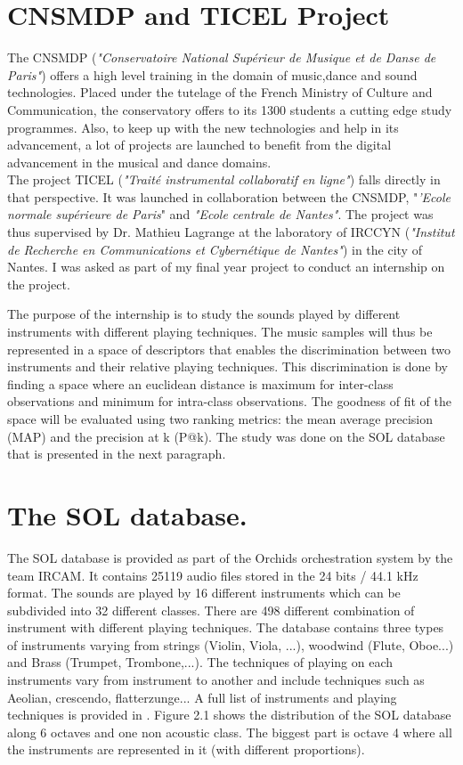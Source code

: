 \documentclass[hidelinks,12pt]{report}
\begin{document}
\section{CNSMDP and TICEL Project}
The CNSMDP  (\textit{"Conservatoire National Supérieur de Musique et de Danse de Paris"}) offers a high level training in the domain of music,dance and sound technologies. Placed under the tutelage of the French Ministry of Culture and Communication, the conservatory offers to its 1300 students a cutting edge study programmes. Also, to keep up with the new technologies and help in its advancement, a lot of projects are launched to benefit from the digital advancement in the musical and dance domains. \\
The project TICEL (\textit{"Traité instrumental collaboratif en ligne"}) falls directly in that perspective. It was launched in collaboration between the CNSMDP, "\textit{'Ecole normale supérieure de Paris}" and \textit{"Ecole centrale de Nantes"}. The project was thus supervised by Dr. Mathieu Lagrange at the laboratory of IRCCYN (\textit{"Institut de Recherche en Communications et Cybernétique de Nantes"}) in the city of Nantes. I was asked as part of my final year project to conduct an internship on the project. \par
The purpose of the internship is to study the sounds played by different instruments with different playing techniques. The music samples will thus be represented in a space of descriptors that enables the  discrimination between two instruments and their relative playing techniques. This discrimination is done by finding a space where an euclidean distance is maximum for inter-class observations and minimum for intra-class observations. The goodness of fit of the space will be evaluated using two ranking metrics: the mean average precision (MAP) and the precision at k (P@k). The study was done on the SOL database that is presented in the next paragraph.  \\ 

\section{The SOL database.}
The SOL database is provided as part of the Orchids orchestration system by the team IRCAM. It contains 25119 audio files stored in the 24 bits / 44.1 kHz format. The sounds are played by 16 different instruments which can be subdivided into 32 different classes. There are 498 different combination of instrument with different playing techniques. The database contains three types of instruments varying from strings (Violin, Viola, ...), woodwind (Flute, Oboe...) and Brass (Trumpet, Trombone,...). The techniques of playing on each instruments vary from instrument to another and include techniques such as Aeolian, crescendo, flatterzunge... A full list of instruments and playing techniques is provided in \cite{SOL}.
Figure 2.1 shows the distribution of the SOL database along 6 octaves and one non acoustic class. The biggest part is octave 4 where all the instruments are represented in it (with different proportions).
\end{document}
